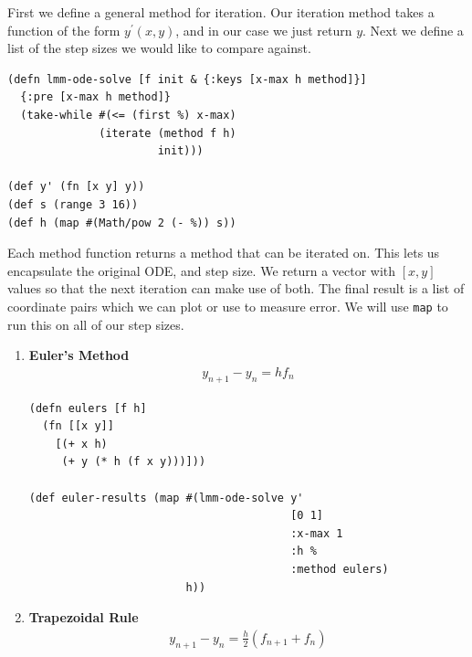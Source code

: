 {\color{blue}

First we define a general method for iteration. Our iteration method
takes a function of the form $y^\prime(x,y)$, and in our case we just
return $y$. Next we define a list of the step sizes we would like to
compare against.

\begin{verbatim}
(defn lmm-ode-solve [f init & {:keys [x-max h method]}]
  {:pre [x-max h method]}
  (take-while #(<= (first %) x-max)
              (iterate (method f h)
                       init)))

(def y' (fn [x y] y))
(def s (range 3 16))
(def h (map #(Math/pow 2 (- %)) s))
\end{verbatim}

Each method function returns a method that can be iterated on. This
lets us encapsulate the original ODE, and step size. We return a
vector with $[x, y]$ values so that the next iteration can make use of
both. The final result is a list of coordinate pairs which we can plot
or use to measure error. We will use \texttt{map} to run this on all
of our step sizes.

\begin{enumerate}[leftmargin=0pt]

\item \textbf{Euler's Method}
\begin{align}
  y_{n+1} - y_n = h f_n
\end{align}

\begin{verbatim}
(defn eulers [f h]
  (fn [[x y]]
    [(+ x h)
     (+ y (* h (f x y)))]))

(def euler-results (map #(lmm-ode-solve y'
                                        [0 1]
                                        :x-max 1
                                        :h %
                                        :method eulers)
                        h))
\end{verbatim}



\item \textbf{Trapezoidal Rule}
\begin{align}
  y_{n+1}- y_n = \frac{h}{2} (f_{n+1} + f_n)
\end{align}


\end{enumerate}}
